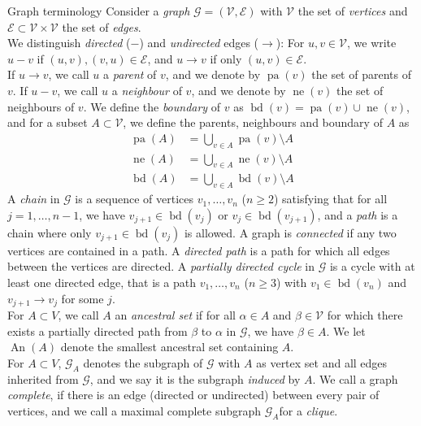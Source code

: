 \documentclass[11pt, a4paper]{memoir}
\theoremstyle{break}
\theoremstyle{break}
\theoremstyle{nonumberplain}
\DeclareMathOperator{\pa}{pa}
\DeclareMathOperator{\nei}{ne}
\DeclareMathOperator{\bd}{bd}
\DeclareMathOperator{\an}{An}
\begin{document}
\begin{mydefinition}{Graph terminology}
Consider a \emph{graph} $\mathcal{G}=(\mathcal{V},\mathcal{E})$ with $\mathcal{V}$ the set of \emph{vertices} and $\mathcal{E}\subset \mathcal{V}\times \mathcal{V}$ the set of \emph{edges}.\\[5pt]
We distinguish \textit{directed} ($-$) and \textit{undirected} edges ($\to$): For $u,v\in \mathcal{V}$, we write $u-v$ if $(u,v),(v,u)\in \mathcal{E}$, and $u\to v$ if only $(u,v)\in \mathcal{E}$. \\[5pt]
If $u\to v$, we call $u$ a \emph{parent} of $v$, and we denote by $\pa(v)$ the set of parents of $v$. If $u-v$, we call $u$ a \emph{neighbour} of $v$, and we denote by $\nei(v)$ the set of neighbours of $v$. We define the \emph{boundary} of $v$ as $\bd(v)=\pa(v)\cup \nei(v)$, and for a subset $A\subset \mathcal{V}$, we define the parents, neighbours and boundary of $A$ as
\begin{align*}
\pa(A)&=\bigcup_{v\in A}\pa(v)\setminus A\\
 \nei(A)&=\bigcup_{v\in A}\nei(v)\setminus A\\
 \bd(A)&=\bigcup_{v\in A}\bd(v)\setminus A
\end{align*}
A \emph{chain} in $\mathcal{G}$ is a sequence of vertices $v_1,\ldots, v_n$ ($n \geqslant 2$) satisfying that for all $j=1,\ldots,n-1$, we have $v_{j+1}\in \bd(v_j)$ or $v_{j}\in \bd(v_{j+1})$, and a \emph{path} is a chain  where only $v_{j+1}\in \bd(v_j)$ is allowed. A graph is \emph{connected} if any two vertices are contained in a path. A \emph{directed path} is a path for which all edges between the vertices are directed. A \textit{partially directed cycle} in $\mathcal{G}$ is a cycle with at least one directed edge, that is a path $v_1,\ldots, v_n$ ($n \geqslant 3$) with $v_1\in \bd(v_n)$ and $v_{j+1}\to v_j$ for some $j$.\\[5pt]
For $A\subset V$, we call $A$ an \emph{ancestral set} if for all $\alpha\in A$ and  $\beta \in \mathcal{V}$ for which there exists a partially directed path from $\beta$ to $\alpha$ in $\mathcal{G}$, we have $\beta \in A$. We let $\an(A)$ denote the smallest ancestral set containing $A$.\\[5pt]
For $A\subset V$, $\mathcal{G}_A$ denotes the subgraph of $\mathcal{G}$ with $A$ as vertex set and all edges inherited from $\mathcal{G}$, and we say it is the subgraph \emph{induced} by $A$.  We call a graph \emph{complete}, if there is an edge (directed or undirected) between every pair of vertices, and we call a maximal complete subgraph $\mathcal{G}_A$for a \emph{clique}.\\[5pt]

\end{mydefinition}
\end{document}
